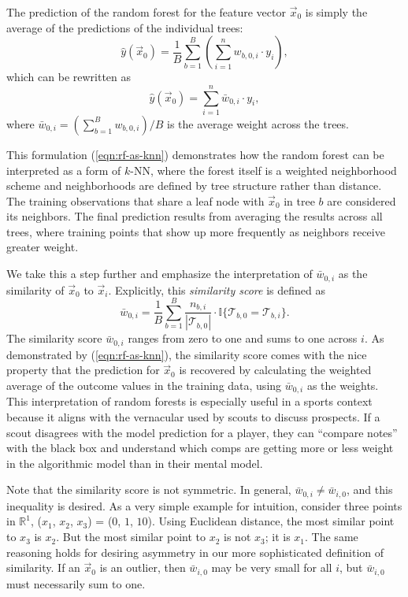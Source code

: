 \documentclass[Review, sageh, times, doublespace]{sagej}
\begin{document}
The prediction of the random forest for the feature vector $\vec x_0$ is simply the average of the predictions of the individual trees:
\begin{equation*}
  \hat{y}(\vec x_0) = \frac{1}{B} \sum_{b = 1}^B \left(\sum_{i = 1}^{n} w_{b,0,i} \cdot y_i\right),
\end{equation*}
which can be rewritten as
\begin{equation}
  \label{eqn:rf-as-knn}
  \hat{y}(\vec x_0) = \sum_{i = 1}^n \bar w_{0,i} \cdot y_i,
\end{equation}
where $\bar w_{0,i} = \left(\sum_{b = 1}^B w_{b,0,i}\right) / B$ is the average weight across the trees.

This formulation (\ref{eqn:rf-as-knn}) demonstrates how the random forest can be interpreted as a form of $k$-NN, where the forest itself is a weighted neighborhood scheme and neighborhoods are defined by tree structure rather than distance. The training observations that share a leaf node with $\vec x_0$ in tree $b$ are considered its neighbors. The final prediction results from averaging the results across all trees, where training points that show up more frequently as neighbors receive greater weight.

We take this a step further and emphasize the interpretation of $\bar w_{0,i}$ as the similarity of $\vec x_0$ to $\vec x_i$. Explicitly, this \textit{similarity score} is defined as
\begin{equation}
  \label{eqn:similarity}
  \bar w_{0,i} = \frac{1}{B}\sum_{b = 1}^B
    \frac{n_{b,i}}{|\mathcal{T}_{b,0}|} \cdot \mathbb{I}\{\mathcal{T}_{b,0} = \mathcal{T}_{b,i}\}.
\end{equation}
The similarity score $\bar w_{0,i}$ ranges from zero to one and sums to one across $i$. As demonstrated by (\ref{eqn:rf-as-knn}), the similarity score comes with the nice property that the prediction for $\vec x_0$ is recovered by calculating the weighted average of the outcome values in the training data, using $\bar w_{0,i}$ as the weights. This interpretation of random forests is especially useful in a sports context because it aligns with the vernacular used by scouts to discuss prospects. If a scout disagrees with the model prediction for a player, they can ``compare notes'' with the black box and understand which comps are getting more or less weight in the algorithmic model than in their mental model.

Note that the similarity score is not symmetric. In general, $\bar w_{0,i} \ne \bar w_{i,0}$, and this inequality is desired. As a very simple example for intuition, consider three points in $\mathbb{R}^1$, ($x_1$, $x_2$, $x_3$) = ($0$, $1$, $10$). Using Euclidean distance, the most similar point to $x_3$ is $x_2$. But the most similar point to $x_2$ is not $x_3$; it is $x_1$. The same reasoning holds for desiring asymmetry in our more sophisticated definition of similarity. If an $\vec x_0$ is an outlier, then $\bar w_{i, 0}$ may be very small for all $i$, but $\bar w_{i, 0}$ must necessarily sum to one.
\end{document}
